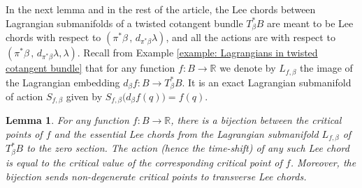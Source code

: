 \documentclass{amsart}
\newtheorem{lemma}[thm]{Lemma}
\theoremstyle{remark}
\begin{document}
In the next lemma and in the rest of the article,
the Lee chords between Lagrangian submanifolds
of a twisted cotangent bundle $T^{\ast}_{\beta}B$
are meant to be Lee chords
with respect to $(\pi^{\ast}\beta \,,\, d_{\pi^{\ast}\beta} \lambda)$,
and all the actions are with respect to 
$(\pi^{\ast}\beta \,,\, d_{\pi^{\ast}\beta} \lambda, \lambda)$.
Recall from Example \ref{example: Lagrangians in twisted cotangent bundle}
that for any function $f: B \rightarrow \mathbb{R}$
we denote by $L_{f, \beta}$
the image of the Lagrangian embedding
$d_{\beta}f: B \rightarrow T_{\beta}^{\ast}B$.
It is an exact Lagrangian submanifold
of action $S_{f, \beta}$ given by
$S_{f, \beta} \big( d_{\beta}f (q) \big) = f(q)$.

\begin{lemma}\label{lemma: bijection critical points f}
For any function $f: B \rightarrow \mathbb{R}$,
there is a bijection between the critical points of $f$
and the essential Lee chords from the Lagrangian submanifold
$L_{f, \beta}$ of $T_{\beta}^{\ast}B$
to the zero section.
The action (hence the time-shift)
of any such Lee chord
is equal to the critical value
of the corresponding critical point of $f$.
Moreover,
the bijection sends non-degenerate critical points
to transverse Lee chords.
\end{lemma}
\end{document}
